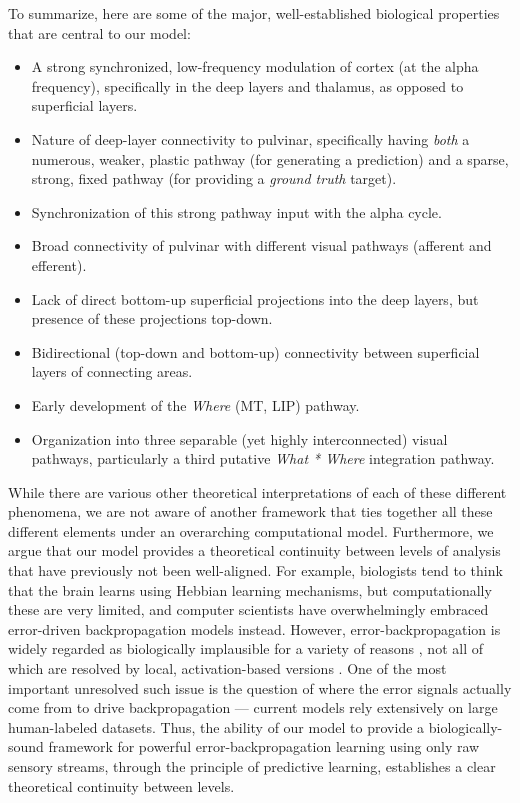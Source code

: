 \documentclass[11pt,twoside]{article}
\newif\myifpdf
\begin{document}
To summarize, here are some of the major, well-established biological properties that are central to our model:
\begin{itemize}
\item A strong synchronized, low-frequency modulation of cortex (at the alpha frequency), specifically in the deep layers and thalamus, as opposed to superficial layers.
\item Nature of deep-layer connectivity to pulvinar, specifically having {\em both} a numerous, weaker, plastic pathway (for generating a prediction) and a sparse, strong, fixed pathway (for providing a {\em ground truth} target).
\item Synchronization of this strong pathway input with the alpha cycle.
\item Broad connectivity of pulvinar with different visual pathways (afferent and efferent).
\item Lack of direct bottom-up superficial projections into the deep layers, but presence of these projections top-down.
\item Bidirectional (top-down and bottom-up) connectivity between superficial layers of connecting areas.
\item Early development of the {\em Where} (MT, LIP) pathway.
\item Organization into three separable (yet highly interconnected) visual pathways, particularly a third putative {\em What * Where} integration pathway.
\end{itemize}

While there are various other theoretical interpretations of each of these different phenomena, we are not aware of another framework that ties together all these different elements under an overarching computational model.  Furthermore, we argue that our model provides a theoretical continuity between levels of analysis that have previously not been well-aligned.  For example, biologists tend to think that the brain learns using Hebbian learning mechanisms, but computationally these are very limited, and computer scientists have overwhelmingly embraced error-driven backpropagation models instead.  However, error-backpropagation is widely regarded as biologically implausible for a variety of reasons \cite[e.g.,]{Crick89}, not all of which are resolved by local, activation-based versions \cite{OReilly96,Movellan90,XieSeung03,ScellierBengio17}.  One of the most important unresolved such issue is the question of where the error signals actually come from to drive backpropagation --- current models rely extensively on large human-labeled datasets.  Thus, the ability of our model to provide a biologically-sound framework for powerful error-backpropagation learning using only raw sensory streams, through the principle of predictive learning, establishes a clear theoretical continuity between levels.
\end{document}
